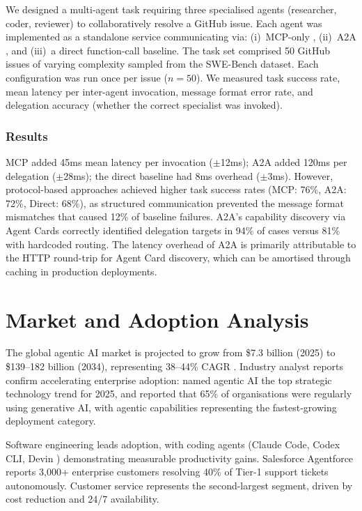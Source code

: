 \documentclass[review,authoryear]{elsarticle}
\theoremstyle{definition}
\begin{document}
We designed a multi-agent task requiring three specialised agents (researcher, coder, reviewer) to collaboratively resolve a GitHub issue. Each agent was implemented as a standalone service communicating via: (i)~MCP-only \citep{anthropic2024mcp}, (ii)~A2A \citep{google2024a2a}, and (iii)~a direct function-call baseline. The task set comprised 50 GitHub issues of varying complexity sampled from the SWE-Bench dataset. Each configuration was run once per issue ($n=50$). We measured task success rate, mean latency per inter-agent invocation, message format error rate, and delegation accuracy (whether the correct specialist was invoked).

\subsubsection{Results}

MCP added 45ms mean latency per invocation ($\pm$12ms); A2A added 120ms per delegation ($\pm$28ms); the direct baseline had 8ms overhead ($\pm$3ms). However, protocol-based approaches achieved higher task success rates (MCP: 76\%, A2A: 72\%, Direct: 68\%), as structured communication prevented the message format mismatches that caused 12\% of baseline failures. A2A's capability discovery via Agent Cards correctly identified delegation targets in 94\% of cases versus 81\% with hardcoded routing. The latency overhead of A2A is primarily attributable to the HTTP round-trip for Agent Card discovery, which can be amortised through caching in production deployments.

\section{Market and Adoption Analysis}\label{sec:market}

The global agentic AI market is projected to grow from \$7.3 billion (2025) to \$139--182 billion (2034), representing 38--44\% CAGR \citep{grandview2025agentic}. Industry analyst reports confirm accelerating enterprise adoption: \citet{gartner2025agentic} named agentic AI the top strategic technology trend for 2025, and \citet{mckinsey2024state} reported that 65\% of organisations were regularly using generative AI, with agentic capabilities representing the fastest-growing deployment category.

Software engineering leads adoption, with coding agents (Claude Code, Codex CLI, Devin \citep{cognition2024devin}) demonstrating measurable productivity gains. Salesforce Agentforce \citep{salesforce2025agentforce} reports 3,000+ enterprise customers resolving 40\% of Tier-1 support tickets autonomously. Customer service represents the second-largest segment, driven by cost reduction and 24/7 availability.
\end{document}
